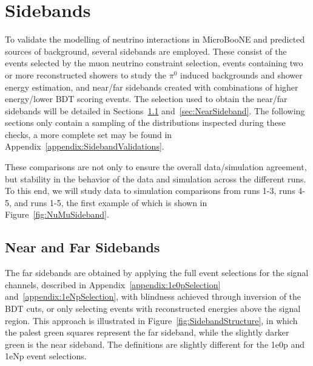 \newpage
\section{Sidebands}
\label{sec:sidebands}


To validate the modelling of neutrino interactions in MicroBooNE and predicted sources of background, several sidebands are employed. These consist of the events selected by the muon neutrino constraint selection, events containing two or more reconstructed showers to study the $\pi^0$ induced backgrounds and shower energy estimation, and near/far sidebands created with combinations of higher energy/lower BDT scoring events. The selection used to obtain the near/far sidebands will be detailed in Sections~\ref{sec:FarSideband} and~\ref{sec:NearSideband}. The following sections only contain a sampling of the distributions inspected during these checks, a more complete set may be found in Appendix~\ref{appendix:SidebandValidations}. 

These comparisons are not only to ensure the overall data/simulation agreement, but stability in the behavior of the data and simulation across the different runs. To this end, we will study data to simulation comparisons from runs 1-3, runs 4-5, and runs 1-5, the first example of which is shown in Figure~\ref{fig:NuMuSideband}.




\subsection{Near and Far Sidebands}
\label{sec:FarSideband}

The far sidebands are obtained by applying the full event selections for the signal channels, described in Appendix~\ref{appendix:1e0pSelection} and~\ref{appendix:1eNpSelection}, with blindness achieved through inversion of the BDT cuts, or only selecting events with reconstructed energies above the signal region. This approach is illustrated in Figure~\ref{fig:SidebandStructure}, in which the palest green squares represent the far sideband, while the slightly darker green is the near sideband. The definitions are slightly different for the 1e0p and 1eNp event selections.


